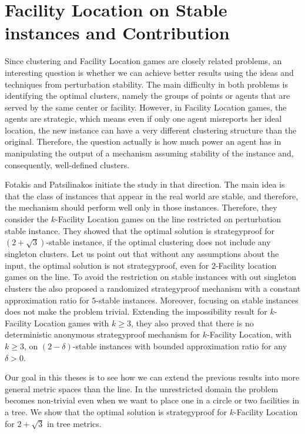 \section{Facility Location on Stable instances and Contribution}



Since clustering and Facility Location games are closely related problems, an interesting question is whether we can achieve better results using the ideas and techniques from perturbation stability. The main difficulty in both problems is identifying the optimal clusters, namely the groups of points or agents that are served by the same center or facility. However, in Facility Location games, the agents are strategic, which means even if only one agent misreports her ideal location, the new instance can have a very different clustering structure than the original. Therefore, the question actually is how much power an agent has in manipulating the output of a mechanism assuming stability of the instance and, consequently, well-defined clusters.





 Fotakis and Patsilinakos \cite{Fotakis2021} initiate the study in that direction. The main idea is that the class of instances that appear in the real world are stable, and therefore, the mechanism should perform well only in those instances. Therefore, they consider the $k$-Facility Location games on the line restricted on perturbation stable instance. They showed that the optimal solution is strategyproof for $(2+\sqrt{3})$-stable instance, if the optimal clustering does not include  any singleton clusters. Let us point out that without any assumptions about the input, the optimal solution is not strategyproof, even for 2-Facility location games on the line. To avoid the restriction on stable instances with out singleton clusters the also proposed a randomized strategyproof mechanism with a constant approximation ratio for $5$-stable instances. Moreover, focusing on stable instances does not make the problem trivial. Extending the impossibility result for $k$-Facility Location games with $k\ge3$, they also proved that there is no deterministic anonymous strategyproof mechanism for $k$-Facility Location, with $k\ge3$, on $(2-\delta)$-stable instances with bounded approximation ratio for any $\delta>0$.

Our goal in this theses is to see how we can extend the previous results into more general metric spaces than the line. In the unrestricted domain the problem becomes non-trivial even when we want to place one in a circle or two facilities in a tree. We show that the optimal solution is strategyproof for $k$-Facility Location for $2+\sqrt{3}$ in tree metrics.



